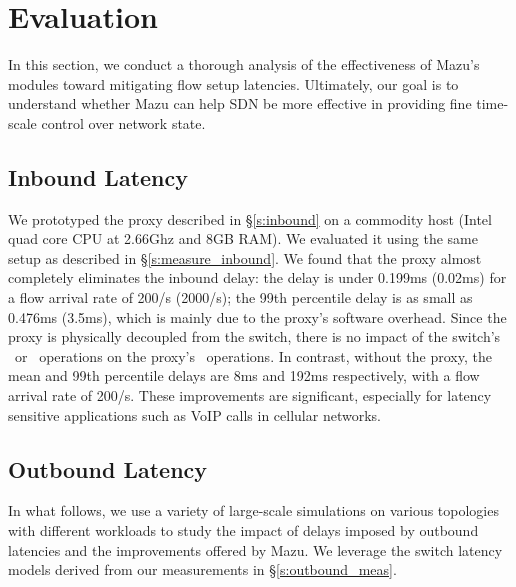 \section{Evaluation}
\label{s:evaluation}

In this section, we conduct a thorough analysis of the effectiveness of Mazu's modules toward mitigating flow setup latencies. Ultimately, our goal is to understand whether Mazu can help SDN be more effective in providing fine time-scale control over network state.

\subsection{Inbound Latency}

We prototyped the proxy described in \S\ref{s:inbound} on a commodity host (Intel quad core CPU at 2.66Ghz and 8GB RAM). 
We evaluated it using the same setup as described in \S\ref{s:measure_inbound}. 
We found that the proxy almost completely eliminates the inbound delay: 
the delay is under 0.199ms (0.02ms) for a flow arrival rate of 200/s (2000/s); the 99th percentile delay is as small as 0.476ms (3.5ms), which is mainly due to the proxy's software overhead.  
 Since the proxy is physically decoupled from the switch, there is no impact of the switch's \flowmod\ or \packetout\ operations on the proxy's \packetin\ operations. 
In contrast, without the proxy, the mean and 99th percentile delays are 8ms and 192ms respectively, with a flow arrival rate of 200/s. 
These improvements are significant, especially for latency sensitive applications such as VoIP calls in cellular networks. 



 
\subsection{Outbound Latency} 
In what follows, we use a variety of large-scale simulations on various topologies with different workloads to study the impact of delays imposed by outbound latencies and the improvements offered by Mazu. We leverage the switch latency models derived from our measurements in \S\ref{s:outbound_meas}.

